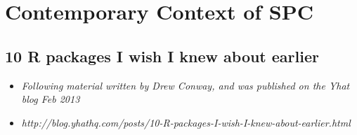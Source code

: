 \documentclass[]{report}
\begin{document}
%
%
%




\section{Contemporary Context of SPC}

\subsection{10 R packages I wish I knew about earlier}
\begin{itemize}
	\item \textit{Following material written by Drew Conway, and was published on the Yhat blog Feb 2013} \item \textit{http://blog.yhathq.com/posts/10-R-packages-I-wish-I-knew-about-earlier.html}
\end{itemize}
\end{document}
